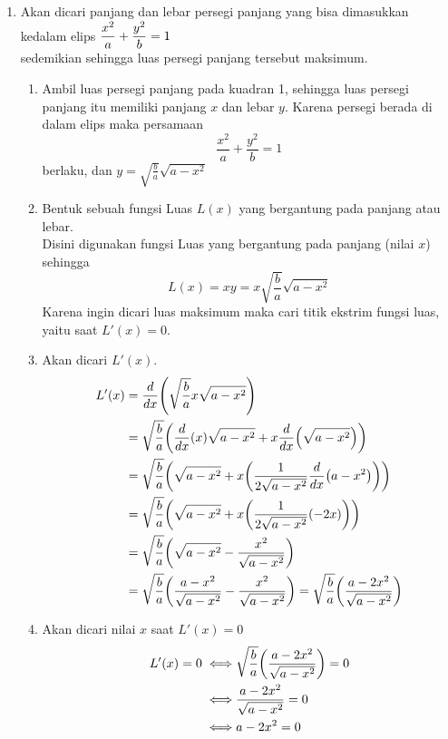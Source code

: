 \begin{enumerate}[leftmargin=*, label={\arabic*}.]
\item Akan dicari panjang dan lebar persegi panjang yang bisa dimasukkan 
kedalam elips $\displaystyle \frac{x^{2}}{a}+\frac{y^{2}}{b}=1$\\
sedemikian sehingga luas persegi panjang tersebut maksimum.



    \begin{enumerate}[label={\alph*}.]
    \item Ambil luas persegi panjang pada kuadran 1, sehingga luas persegi panjang itu
    memiliki panjang $x$ dan lebar $y$. Karena persegi berada di dalam elips maka persamaan
    \[
        \frac{x^{2}}{a}+\frac{y^{2}}{b}=1
    \]
    berlaku, dan $y=\sqrt{\frac{b}{a}}\sqrt{a-x^{2}}$
    \item Bentuk sebuah fungsi Luas $L(x)$ yang bergantung pada panjang atau lebar.\\
    Disini digunakan fungsi Luas yang bergantung pada panjang (nilai $x$) sehingga
    \[
        L(x) = xy = x\sqrt{\frac{b}{a}}\sqrt{a-x^{2}}
    \]
    Karena ingin dicari luas maksimum maka cari titik ekstrim fungsi luas, yaitu saat 
    $L'(x)=0$.
    \item Akan dicari $L'(x)$.
    \begin{align*}
        L'(x) &= \drv{x}{\sqrt{\frac{b}{a}}x\sqrt{a-x^{2}}}\\
        &= \sqrt{\frac{b}{a}}\brk*{\drv{x}{x}\sqrt{a-x^{2}} +x\drv{x}{\sqrt{a-x^{2}}}}\\
        &= \sqrt{\frac{b}{a}}\brk*{\sqrt{a-x^{2}}+x\brk*{\frac{1}{2\sqrt{a-x^{2}}}\drv{x}{a-x^{2}}}}\\ 
        &= \sqrt{\frac{b}{a}}\brk*{\sqrt{a-x^{2}}+x\brk*{\frac{1}{2\sqrt{a-x^{2}}}(-2x)}} \\
        &= \sqrt{\frac{b}{a}}\brk*{\sqrt{a-x^{2}}-\frac{x^{2}}{\sqrt{a-x^{2}}}}\\ 
        &= \sqrt{\frac{b}{a}}\brk*{\frac{a-x^{2}}{\sqrt{a-x^{2}}}-\frac{x^{2}}{\sqrt{a-x^{2}}}}
        = \sqrt{\frac{b}{a}}\brk*{\frac{a-2x^{2}}{\sqrt{a-x^{2}}}} 
    \end{align*}
    \item Akan dicari nilai $x$ saat $L'(x)=0$
    \begin{align*}
        L'(x) = 0 \iff &\sqrt{\frac{b}{a}}\brk*{\frac{a-2x^{2}}{\sqrt{a-x^{2}}}} =0\\
        \iff &\frac{a-2x^{2}}{\sqrt{a-x^{2}}} = 0\\
        \iff &a-2x^{2} = 0\\

\end{align*}
\end{enumerate}
\end{enumerate}
